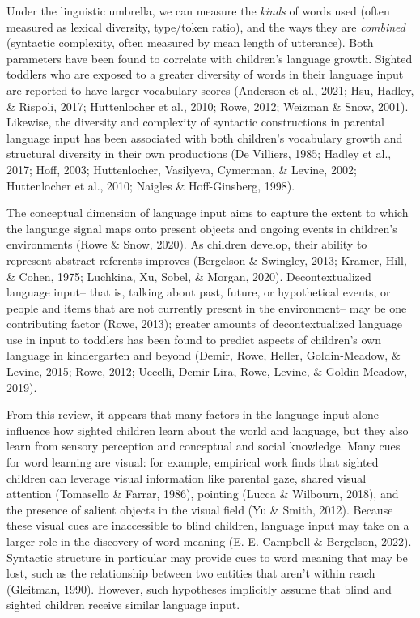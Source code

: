 \documentclass[
  man]{apa6}
\begin{document}
Under the linguistic umbrella, we can measure the \emph{kinds} of words used (often measured as lexical diversity, type/token ratio), and the ways they are \emph{combined} (syntactic complexity, often measured by mean length of utterance). Both parameters have been found to correlate with children's language growth. Sighted toddlers who are exposed to a greater diversity of words in their language input are reported to have larger vocabulary scores (Anderson et al., 2021; Hsu, Hadley, \& Rispoli, 2017; Huttenlocher et al., 2010; Rowe, 2012; Weizman \& Snow, 2001). Likewise, the diversity and complexity of syntactic constructions in parental language input has been associated with both children's vocabulary growth and structural diversity in their own productions (De Villiers, 1985; Hadley et al., 2017; Hoff, 2003; Huttenlocher, Vasilyeva, Cymerman, \& Levine, 2002; Huttenlocher et al., 2010; Naigles \& Hoff-Ginsberg, 1998).

The conceptual dimension of language input aims to capture the extent to which the language signal maps onto present objects and ongoing events in children's environments (Rowe \& Snow, 2020). As children develop, their ability to represent abstract referents improves (Bergelson \& Swingley, 2013; Kramer, Hill, \& Cohen, 1975; Luchkina, Xu, Sobel, \& Morgan, 2020). Decontextualized language input-- that is, talking about past, future, or hypothetical events, or people and items that are not currently present in the environment-- may be one contributing factor (Rowe, 2013); greater amounts of decontextualized language use in input to toddlers has been found to predict aspects of children's own language in kindergarten and beyond (Demir, Rowe, Heller, Goldin-Meadow, \& Levine, 2015; Rowe, 2012; Uccelli, Demir-Lira, Rowe, Levine, \& Goldin-Meadow, 2019).

From this review, it appears that many factors in the language input alone influence how sighted children learn about the world and language, but they also learn from sensory perception and conceptual and social knowledge. Many cues for word learning are visual: for example, empirical work finds that sighted children can leverage visual information like parental gaze, shared visual attention (Tomasello \& Farrar, 1986), pointing (Lucca \& Wilbourn, 2018), and the presence of salient objects in the visual field (Yu \& Smith, 2012). Because these visual cues are inaccessible to blind children, language input may take on a larger role in the discovery of word meaning (E. E. Campbell \& Bergelson, 2022). Syntactic structure in particular may provide cues to word meaning that may be lost, such as the relationship between two entities that aren't within reach (Gleitman, 1990). However, such hypotheses implicitly assume that blind and sighted children receive similar language input.
\end{document}
